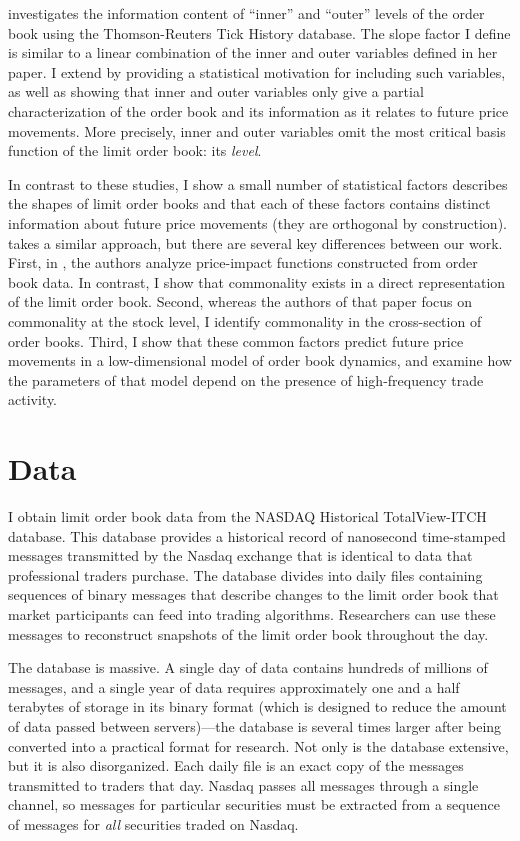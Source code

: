 		\citet{Yuferova2015} investigates the information content of ``inner'' and ``outer'' levels of the order book using the Thomson-Reuters Tick History database. The slope factor I define is similar to a linear combination of the inner and outer variables defined in her paper. I extend \citet{Yuferova2015} by providing a statistical motivation for including such variables, as well as showing that inner and outer variables only give a partial characterization of the order book and its information as it relates to future price movements. More precisely, inner and outer variables omit the most critical basis function of the limit order book: its \textit{level}.

		In contrast to these studies, I show a small number of statistical factors describes the shapes of limit order books and that each of these factors contains distinct information about future price movements (they are orthogonal by construction). \citet{Beltran-Lopez2009} takes a similar approach, but there are several key differences between our work. First, in \citet{Beltran-Lopez2009}, the authors analyze price-impact functions constructed from order book data. In contrast, I show that commonality exists in a direct representation of the limit order book. Second, whereas the authors of that paper focus on commonality at the stock level, I identify commonality in the cross-section of order books. Third, I show that these common factors predict future price movements in a low-dimensional model of order book dynamics, and examine how the parameters of that model depend on the presence of high-frequency trade activity.


\section{Data}
	I obtain limit order book data from the NASDAQ Historical TotalView-ITCH database. This database provides a historical record of nanosecond time-stamped messages transmitted by the Nasdaq exchange that is identical to data that professional traders purchase. The database divides into daily files containing sequences of binary messages that describe changes to the limit order book that market participants can feed into trading algorithms. Researchers can use these messages to reconstruct snapshots of the limit order book throughout the day.

	The database is massive. A single day of data contains hundreds of millions of messages, and a single year of data requires approximately one and a half terabytes of storage in its binary format (which is designed to reduce the amount of data passed between servers)---the database is several times larger after being converted into a practical format for research. Not only is the database extensive, but it is also disorganized. Each daily file is an exact copy of the messages transmitted to traders that day. Nasdaq passes all messages through a single channel, so messages for particular securities must be extracted from a sequence of messages for \textit{all} securities traded on Nasdaq.

